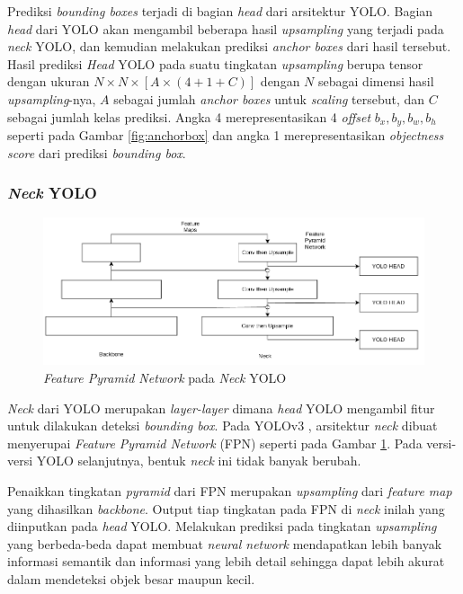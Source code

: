     Prediksi \emph{bounding boxes} terjadi di bagian \emph{head} dari arsitektur YOLO.
    Bagian \emph{head} dari YOLO akan mengambil beberapa hasil \emph{upsampling} yang terjadi pada \emph{neck} YOLO, dan kemudian melakukan prediksi \emph{anchor boxes} dari hasil tersebut.
    Hasil prediksi \emph{Head} YOLO pada suatu tingkatan \emph{upsampling} berupa tensor dengan ukuran $N\times N \times [A\times(4+1+C)]$ dengan $N$ sebagai dimensi hasil \emph{upsampling}-nya, $A$ sebagai jumlah \emph{anchor boxes} untuk \emph{scaling} tersebut, dan $C$ sebagai jumlah kelas prediksi.
    Angka 4 merepresentasikan 4 \emph{offset} $b_x, b_y, b_w, b_h$ seperti pada Gambar \ref{fig:anchorbox} dan angka 1 merepresentasikan \emph{objectness score} dari prediksi \emph{bounding box}.

  \subsubsection{\emph{Neck} YOLO}

    \begin{figure}[ht]
        \centering
        \includegraphics[scale=0.6]{pictures/yolo-architecture-rough.png}
        \caption{\emph{Feature Pyramid Network} pada \emph{Neck} YOLO}
        \label{fig:yolofpn}
    \end{figure}

    \emph{Neck} dari YOLO merupakan \emph{layer-layer} dimana \emph{head} YOLO mengambil fitur untuk dilakukan deteksi \emph{bounding box}.
    Pada YOLOv3 \textcite{yolov3}, arsitektur \emph{neck} dibuat menyerupai \emph{Feature Pyramid Network} (FPN) seperti pada Gambar \ref{fig:yolofpn}. 
    Pada versi-versi YOLO selanjutnya, bentuk \emph{neck} ini tidak banyak berubah.

    Penaikkan tingkatan \emph{pyramid} dari FPN merupakan \emph{upsampling} dari \emph{feature map} yang dihasilkan \emph{backbone}.
    Output tiap tingkatan pada FPN di \emph{neck} inilah yang diinputkan pada \emph{head} YOLO. 
    Melakukan prediksi pada tingkatan \emph{upsampling} yang berbeda-beda dapat membuat \emph{neural network} mendapatkan lebih banyak informasi semantik dan informasi yang lebih detail sehingga dapat lebih akurat dalam mendeteksi objek besar maupun kecil.

